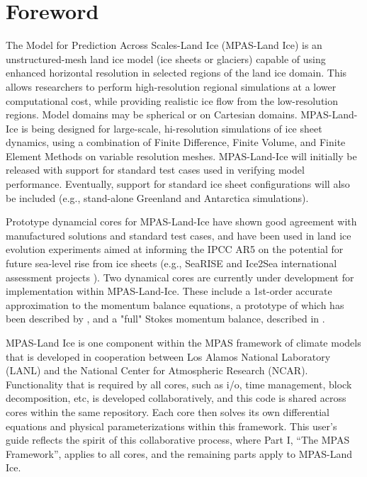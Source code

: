 \chapter*{Foreword}
\label{chap:foreword}

The Model for Prediction Across Scales-Land Ice (MPAS-Land Ice) is an unstructured-mesh land ice model (ice sheets or glaciers) capable of using enhanced horizontal resolution in selected regions of the land ice domain.  This allows researchers to perform high-resolution regional simulations at a lower computational cost, while providing realistic ice flow from the low-resolution regions. Model domains may be spherical or on Cartesian domains.  MPAS-Land-Ice is being designed for large-scale, hi-resolution simulations of ice sheet dynamics, using a combination of Finite Difference, Finite Volume, and Finite Element Methods on variable resolution meshes.  MPAS-Land-Ice will initially be released with support for standard test cases used in verifying model performance. Eventually, support for standard ice sheet configurations will also be included (e.g., stand-alone Greenland and Antarctica simulations).

Prototype dynamcial cores for MPAS-Land-Ice have shown good agreement with manufactured solutions and standard test cases, and have been used in land ice evolution experiments aimed at informing the IPCC AR5 on the potential for future sea-level rise from ice sheets (e.g., SeaRISE and Ice2Sea international assessment projects \citep{Shannon2013, Edwards2013b}).  Two dynamical cores are currently under development for implementation within MPAS-Land-Ice. These include a 1st-order accurate approximation to the momentum balance equations, a prototype of which has been described by \citet{Perego2012} , and a "full" Stokes momentum balance, described in \citet{Leng2012}. 

MPAS-Land Ice is one component within the MPAS framework of climate models that is developed in cooperation between Los Alamos National Laboratory (LANL) and the National Center for Atmospheric Research (NCAR).  Functionality that is required by all cores, such as i/o, time management, block decomposition, etc, is developed collaboratively, and this code is shared across cores within the same repository.  Each core then solves its own differential equations and physical parameterizations within this framework.  This user's guide reflects the spirit of this collaborative process, where Part I, ``The MPAS Framework'', applies to all cores, and the remaining parts apply to MPAS-Land Ice.

